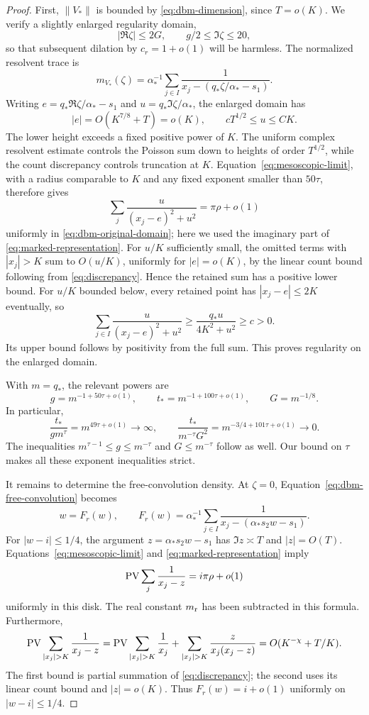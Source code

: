 \begin{proof}
First, \(\|V_*\|\) is bounded by
\eqref{eq:dbm-dimension}, since \(T=o(K)\).
We verify a slightly enlarged regularity domain,
\[
 |\Re\zeta|\le2G,\qquad g/2\le\Im\zeta\le20,
\]
so that subsequent dilation by \(c_r=1+o(1)\) will be harmless.
The normalized resolvent trace is
\[
 m_{V_*}(\zeta)=
   \alpha_*^{-1}\sum_{j\in I}
        \frac1{x_j-(q_*\zeta/\alpha_*-s_1)}.
\]
Writing \(e=q_*\Re\zeta/\alpha_*-s_1\) and
\(u=q_*\Im\zeta/\alpha_*\), the enlarged domain has
\begin{equation}
 \label{eq:dbm-original-domain}
 |e|=O(K^{7/8}+T)=o(K),\qquad
 cT^{1/2}\le u\le CK.
\end{equation}
The lower height exceeds a fixed positive power of \(K\).
The uniform complex resolvent estimate controls the Poisson sum down to
heights of order \(T^{1/2}\), while the count discrepancy controls
truncation at \(K\).
Equation~\eqref{eq:mesoscopic-limit}, with a radius comparable to \(K\)
and any fixed exponent smaller than \(50\tau\), therefore gives
\[
 \sum_j\frac{u}{(x_j-e)^2+u^2}
       =\pi\rho+o(1)
\]
uniformly in \eqref{eq:dbm-original-domain}; here we used the
imaginary part of \eqref{eq:marked-representation}.
For \(u/K\) sufficiently small, the omitted terms with \(|x_j|>K\)
sum to \(O(u/K)\), uniformly for \(|e|=o(K)\), by the linear count
bound following from \eqref{eq:discrepancy}. Hence the retained sum
has a positive lower bound. For \(u/K\) bounded below, every retained
point has \(|x_j-e|\le2K\) eventually, so
\[
 \sum_{j\in I}\frac{u}{(x_j-e)^2+u^2}
   \ge \frac{q_*u}{4K^2+u^2}\ge c>0.
\]
Its upper bound follows by positivity from the full sum.
This proves regularity on the enlarged domain.

With \(m=q_*\), the relevant powers are
\[
 g=m^{-1+50\tau+o(1)},\qquad
 t_*=m^{-1+100\tau+o(1)},\qquad G=m^{-1/8}.
\]
In particular,
\[
 \frac{t_*}{g m^\tau}=m^{49\tau+o(1)}\longrightarrow\infty,
 \qquad
 \frac{t_*}{m^{-\tau}G^2}
     =m^{-3/4+101\tau+o(1)}\longrightarrow0.
\]
The inequalities \(m^{\tau-1}\le g\le m^{-\tau}\) and
\(G\le m^{-\tau}\) follow as well. Our bound on \(\tau\) makes all
these exponent inequalities strict.

It remains to determine the free-convolution density. At \(\zeta=0\),
Equation~\eqref{eq:dbm-free-convolution} becomes
\begin{equation}
 \label{eq:dbm-boundary-equation}
 w=F_r(w),\qquad
 F_r(w)=\alpha_*^{-1}\sum_{j\in I}
     \frac1{x_j-(\alpha_*s_2w-s_1)}.
\end{equation}
For \(|w-i|\le1/4\), the argument
\(z=\alpha_*s_2w-s_1\) has \(\Im z\asymp T\) and \(|z|=O(T)\).
Equations~\eqref{eq:mesoscopic-limit} and
\eqref{eq:marked-representation} imply
\[
 \operatorname{PV}\sum_j\frac1{x_j-z}=i\pi\rho+o(1)
\]
uniformly in this disk. The real constant \(m_{\rm r}\) has been
subtracted in this formula. Furthermore,
\[
 \PV\sum_{|x_j|>K}\frac1{x_j-z}
   =\PV\sum_{|x_j|>K}\frac1{x_j}
      +\sum_{|x_j|>K}\frac{z}{x_j(x_j-z)}
   =O(K^{-\chi}+T/K).
\]
The first bound is partial summation of
\eqref{eq:discrepancy}; the second uses its linear count bound and
\(|z|=o(K)\). Thus \(F_r(w)=i+o(1)\) uniformly on
\(|w-i|\le1/4\).


\end{proof}
